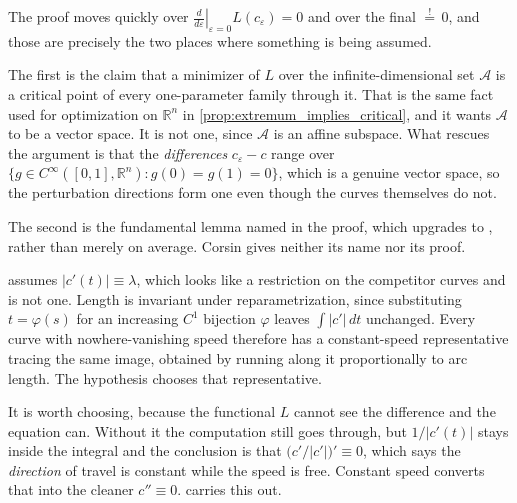 \begin{remark}
\label{rem:geodesic_hidden_steps}
The proof moves quickly over $\left.\frac{d}{d\varepsilon}\right|_{\varepsilon=0}L(c_\varepsilon)
= 0$ and over the final $\overset{!}{=}\,0$, and those are precisely the two places where
something is being assumed.

The first is the claim that a minimizer of $L$ over the infinite-dimensional set $\mathcal A$ is
a critical point of every one-parameter family through it. That is the same fact used for
optimization on $\mathbb{R}^n$ in \cref{prop:extremum_implies_critical}, and it wants $\mathcal A$
to be a vector space. It is not one, since $\mathcal A$ is an affine subspace. What rescues the
argument is that the \emph{differences} $c_\varepsilon - c$ range over
$\{g \in C^\infty([0,1],\mathbb{R}^n) : g(0)=g(1)=0\}$, which is a genuine vector space, so the
perturbation directions form one even though the curves themselves do not.

The second is the fundamental lemma named in the proof, which upgrades  to , rather than merely on average. Corsin gives
neither its name nor its proof.
\end{remark}

\begin{remark}
\label{rem:geodesic_constant_speed}
 assumes $\lvert c'(t)\rvert \equiv \lambda$, which looks like
a restriction on the competitor curves and is not one. Length is invariant under
reparametrization, since substituting $t = \varphi(s)$ for an increasing $C^1$ bijection
$\varphi$ leaves $\int\lvert c'\rvert\,dt$ unchanged. Every curve with nowhere-vanishing speed
therefore has a constant-speed representative tracing the same image, obtained by running along
it proportionally to arc length. The hypothesis chooses that representative.

It is worth choosing, because the functional $L$ cannot see the difference and the equation can.
Without it the computation still goes through, but $1/\lvert c'(t)\rvert$ stays inside the
integral and the conclusion is that $\big(c'/\lvert c'\rvert\big)' \equiv 0$, which says the
\emph{direction} of travel is constant while the speed is free. Constant speed converts that
into the cleaner $c'' \equiv 0$.  carries this out.
\end{remark}

